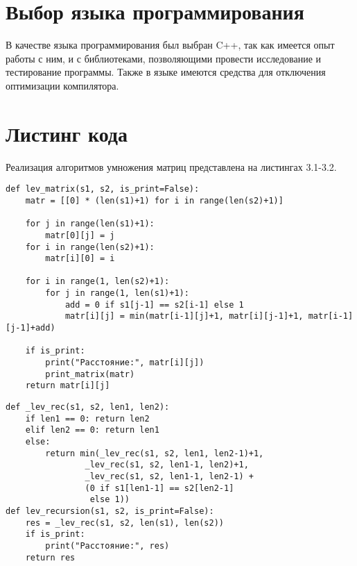 \section{Выбор языка программирования}
В качестве языка программирования был выбран C++, так как имеется опыт работы с ним, и с библиотеками, позволяющими провести исследование и тестирование программы. Также в языке имеются средства для отключения оптимизации компилятора.


\section{Листинг кода}
Реализация алгоритмов умножения матриц представлена на листингах 3.1-3.2.

\begin{lstlisting}[caption = Функция умножения матриц классическим алгоритмом.]
def lev_matrix(s1, s2, is_print=False):
	matr = [[0] * (len(s1)+1) for i in range(len(s2)+1)]
	
	for j in range(len(s1)+1):
		matr[0][j] = j
	for i in range(len(s2)+1):
		matr[i][0] = i
	
	for i in range(1, len(s2)+1):
		for j in range(1, len(s1)+1):
			add = 0 if s1[j-1] == s2[i-1] else 1
			matr[i][j] = min(matr[i-1][j]+1, matr[i][j-1]+1, matr[i-1][j-1]+add)
	
	if is_print:
		print("Расстояние:", matr[i][j])
		print_matrix(matr)
	return matr[i][j]
\end{lstlisting}

\begin{lstlisting}[caption = Функция умножения матриц алгоритмом Винограда.]
def _lev_rec(s1, s2, len1, len2):
	if len1 == 0: return len2
	elif len2 == 0: return len1
	else:
		return min(_lev_rec(s1, s2, len1, len2-1)+1,
				_lev_rec(s1, s2, len1-1, len2)+1,
				_lev_rec(s1, s2, len1-1, len2-1) + 
				(0 if s1[len1-1] == s2[len2-1]
				 else 1))
def lev_recursion(s1, s2, is_print=False):
	res = _lev_rec(s1, s2, len(s1), len(s2))
	if is_print:
		print("Расстояние:", res)
	return res
\end{lstlisting}

